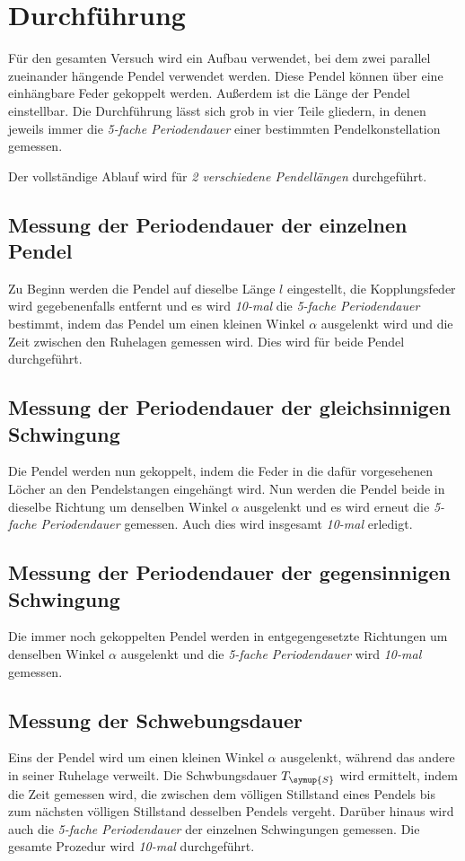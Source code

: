 \section{Durchführung}
\label{sec:Durchführung}
Für den gesamten Versuch wird ein Aufbau verwendet, bei dem zwei parallel zueinander hängende Pendel verwendet werden. Diese Pendel können über
eine einhängbare Feder gekoppelt werden. Außerdem ist die Länge der Pendel einstellbar.
Die Durchführung lässt sich grob in vier Teile gliedern, in denen jeweils immer die \textit{5-fache Periodendauer} einer bestimmten Pendelkonstellation
gemessen.

Der vollständige Ablauf wird für \textit{2 verschiedene Pendellängen} durchgeführt.


\subsection{Messung der Periodendauer der einzelnen Pendel}
Zu Beginn werden die Pendel auf dieselbe Länge $l$ eingestellt, die Kopplungsfeder wird gegebenenfalls entfernt und es wird \textit{10-mal} die 
\textit{5-fache Periodendauer} bestimmt, indem das Pendel um einen kleinen Winkel $\alpha$ ausgelenkt wird und die Zeit zwischen den Ruhelagen 
gemessen wird. Dies wird für beide Pendel durchgeführt.

\subsection{Messung der Periodendauer der gleichsinnigen Schwingung}
Die Pendel werden nun gekoppelt, indem die Feder in die dafür vorgesehenen Löcher an den Pendelstangen eingehängt wird. Nun werden die Pendel beide 
in dieselbe Richtung um denselben Winkel $\alpha$ ausgelenkt und es wird erneut die \textit{5-fache Periodendauer} gemessen. Auch dies wird 
insgesamt \textit{10-mal} erledigt.

\subsection{Messung der Periodendauer der gegensinnigen Schwingung}
Die immer noch gekoppelten Pendel werden in entgegengesetzte Richtungen um denselben Winkel $\alpha$ ausgelenkt und die \textit{5-fache Periodendauer}
wird \textit{10-mal} gemessen.

\subsection{Messung der Schwebungsdauer}
Eins der Pendel wird um einen kleinen Winkel $\alpha$ ausgelenkt, während das andere in seiner Ruhelage verweilt. Die Schwbungsdauer $T_{\symup{S}}$ wird
ermittelt, indem die Zeit gemessen wird, die zwischen dem völligen Stillstand eines Pendels bis zum nächsten völligen Stillstand desselben Pendels vergeht.
Darüber hinaus wird auch die \textit{5-fache Periodendauer} der einzelnen Schwingungen gemessen. Die gesamte Prozedur wird \textit{10-mal} durchgeführt.